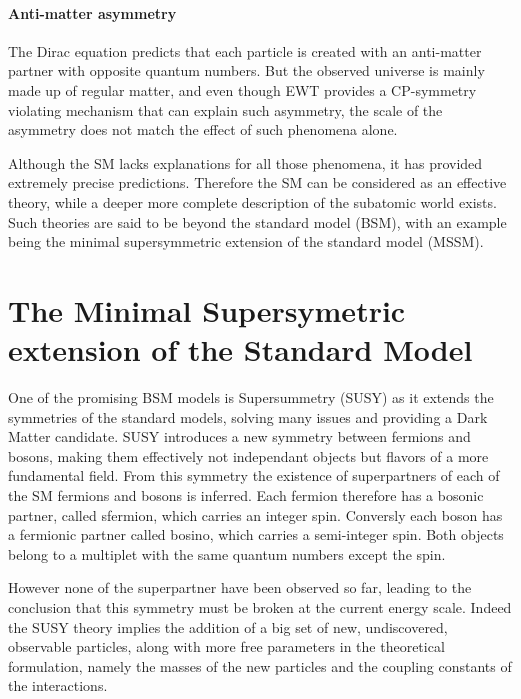 \paragraph{Anti-matter asymmetry} The Dirac equation predicts that each particle is created with an anti-matter partner with opposite quantum numbers. But the observed universe is mainly made up of regular matter, and even though EWT provides a CP-symmetry violating mechanism that can explain such asymmetry, the scale of the asymmetry does not match the effect of such phenomena alone.\newline

Although the SM lacks explanations for all those phenomena, it has provided extremely precise predictions. Therefore the SM can be considered as an effective theory, while a deeper more complete description of the subatomic world exists. Such theories are said to be beyond the standard model (BSM), with an example being the minimal supersymmetric extension of the standard model (MSSM).


\section{The Minimal Supersymetric extension of the Standard Model}
\label{sec:MSSM}

One of the promising BSM models is Supersummetry (SUSY) as it extends the symmetries of the standard models, solving many issues and providing a Dark Matter candidate. SUSY \cite{Martin:1997ns} introduces a new symmetry between fermions and bosons, making them effectively not independant objects but flavors of a more fundamental field. From this symmetry the existence of superpartners of each of the SM fermions and bosons is inferred. Each fermion therefore has a bosonic partner, called sfermion, which carries an integer spin. Conversly each boson has a fermionic partner called bosino, which carries a semi-integer spin. Both objects belong to a multiplet with the same quantum numbers except the spin.\newline

However none of the superpartner have been observed so far, leading to the conclusion that this symmetry must be broken at the current energy scale. Indeed the SUSY theory implies the addition of a big set of new, undiscovered, observable particles, along with more free parameters in the theoretical formulation, namely the masses of the new particles and the coupling constants of the interactions.\newline

